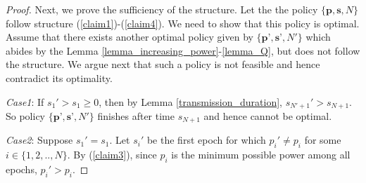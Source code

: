 \begin{proof}

Next, we prove the sufficiency of the structure. Let the the policy $\{\textbf{p},\textbf{s},N\}$ follow  structure (\ref{claim1})-(\ref{claim4}). We need to show that this policy is optimal. Assume that there exists another optimal policy given by $\{\textbf{p'},\textbf{s'},N'\}$ which abides by the Lemma \ref{lemma_increasing_power}-\ref{lemma_Q}, but does not follow the structure. We argue next that such a policy is not feasible and hence contradict its optimality. 

\textit{Case1}: If $s_1'>s_1\ge 0$, then by Lemma \ref{transmission_duration}, $s_{N'+1}'>s_{N+1}$. So policy $\{\textbf{p'},\textbf{s'},N'\}$ finishes after time $s_{N+1}$ and hence cannot be optimal. 

\textit{Case2}: Suppose $s_1'=s_1$. Let $s_i'$ be the first epoch for which $p_i'\ne p_i$ for some $i \in \{1,2,..,N\}$. By (\ref{claim3}), since $p_i$ is the minimum possible power among all epochs, $p_i'>p_i$. 



\end{proof}
